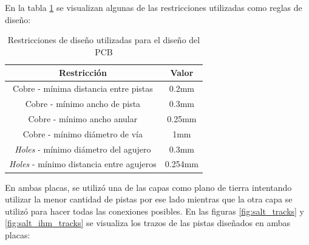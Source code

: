 En la tabla \ref{tab:design_constraints} se visualizan algunas de las restricciones utilizadas como reglas de diseño:

\begin{table}[H]
    \centering
    \begin{tabular}{|c|c|}
        \hline
         \textbf{Restricción} & \textbf{Valor}  \\ \hline
         Cobre - mínima distancia entre pistas & 0.2mm  \\ \hline
         Cobre - mínimo ancho de pista & 0.3mm  \\ \hline
         Cobre - mínimo ancho anular  & 0.25mm  \\ \hline
         Cobre - mínimo diámetro de vía  & 1mm  \\ \hline
         \textit{Holes} - mínimo diámetro del agujero & 0.3mm \\ \hline
         \textit{Holes} - mínimo distancia entre agujeros & 0.254mm \\
         \hline
    \end{tabular}
    \caption{Restricciones de diseño utilizadas para el diseño del PCB}
    \label{tab:design_constraints}
\end{table}


En ambas placas, se utilizó una de las capas como plano de tierra intentando utilizar la menor cantidad de pistas por ese lado mientras que la otra capa se utilizó para hacer todas las conexiones posibles. En las figuras \ref{fig:salt_tracks} y \ref{fig:salt_ihm_tracks} se visualiza los trazos de las pistas diseñados en ambas placas: 


